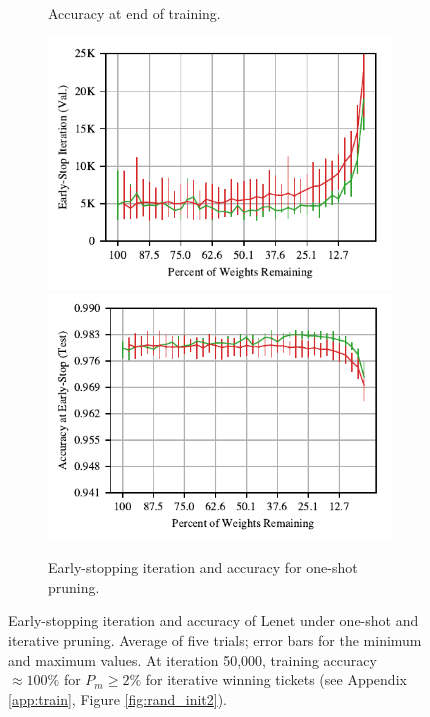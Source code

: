 \begin{figure}
\begin{subfigure}{.33\textwidth}
\vspace{-.5em}
\caption{Accuracy at end of training.}
\end{subfigure}%
\begin{subfigure}{.66\textwidth}
\includegraphics[width=.5\textwidth]{graphs/mnist/lenet/oneshot/iteration}%
\includegraphics[width=.5\textwidth]{graphs/mnist/lenet/oneshot/accuracy}%
\vspace{-.5em}
\caption{Early-stopping iteration and accuracy for one-shot pruning.}
\end{subfigure}
\caption{Early-stopping iteration and accuracy of Lenet under one-shot and iterative pruning. Average of five trials; error
bars for the minimum and maximum values. At iteration 50,000, training accuracy $\approx 100\%$ for $P_m \geq 2\%$ for iterative winning tickets (see Appendix \ref{app:train}, Figure \ref{fig:rand_init2}).}
\label{fig:oneshot_conv_graphs}
\label{fig:rand_init}
\end{figure}